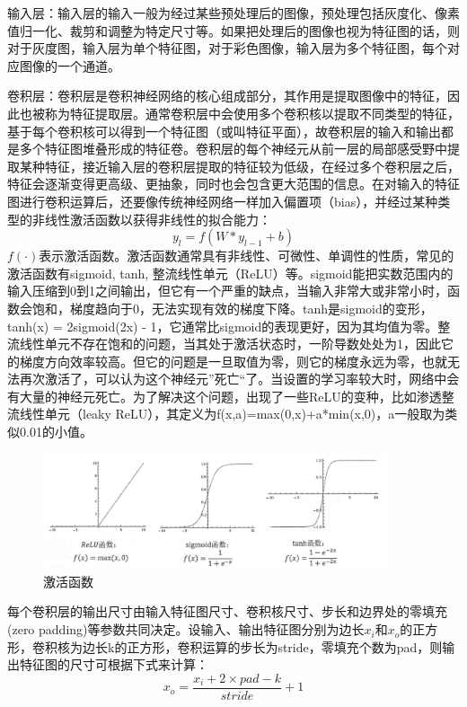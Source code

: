 输入层：输入层的输入一般为经过某些预处理后的图像，预处理包括灰度化、像素值归一化、裁剪和调整为特定尺寸等。如果把处理后的图像也视为特征图的话，则对于灰度图，输入层为单个特征图，对于彩色图像，输入层为多个特征图，每个对应图像的一个通道。

卷积层：卷积层是卷积神经网络的核心组成部分，其作用是提取图像中的特征，因此也被称为特征提取层。通常卷积层中会使用多个卷积核以提取不同类型的特征，基于每个卷积核可以得到一个特征图（或叫特征平面），故卷积层的输入和输出都是多个特征图堆叠形成的特征卷。卷积层的每个神经元从前一层的局部感受野中提取某种特征，接近输入层的卷积层提取的特征较为低级，在经过多个卷积层之后，特征会逐渐变得更高级、更抽象，同时也会包含更大范围的信息。在对输入的特征图进行卷积运算后，还要像传统神经网络一样加入偏置项（bias），并经过某种类型的非线性激活函数以获得非线性的拟合能力：
%
\begin{equation}
y_l = f(W*y_{l-1}+b)
\end{equation}
$f(\cdot)$表示激活函数。激活函数通常具有非线性、可微性、单调性的性质，常见的激活函数有sigmoid, tanh, 整流线性单元（ReLU）等。sigmoid能把实数范围内的输入压缩到0到1之间输出，但它有一个严重的缺点，当输入非常大或非常小时，函数会饱和，梯度趋向于0，无法实现有效的梯度下降。tanh是sigmoid的变形，tanh(x) = 2sigmoid(2x) - 1，它通常比sigmoid的表现更好，因为其均值为零。整流线性单元不存在饱和的问题，当其处于激活状态时，一阶导数处处为1，因此它的梯度方向效率较高。但它的问题是一旦取值为零，则它的梯度永远为零，也就无法再次激活了，可以认为这个神经元”死亡“了。当设置的学习率较大时，网络中会有大量的神经元死亡。为了解决这个问题，出现了一些ReLU的变种，比如渗透整流线性单元（leaky ReLU）\cite{maas2013rectifier}，其定义为f(x,a)=max(0,x)+a*min(x,0)，a一般取为类似0.01的小值。
\begin{figure}[htb] %
	\centering
	\includegraphics[width=4in]{figures/3_1_激活函数}
	\caption{激活函数} \label{fig:3_1_激活函数}
\end{figure}

每个卷积层的输出尺寸由输入特征图尺寸、卷积核尺寸、步长和边界处的零填充(zero padding)等参数共同决定。设输入、输出特征图分别为边长$x_{i}$和$x_{o}$的正方形，卷积核为边长k的正方形，卷积运算的步长为stride，零填充个数为pad，则输出特征图的尺寸可根据下式来计算：
%
\begin{equation}
x_o = \frac{x_i + 2 \times pad - k}{stride} + 1
\end{equation}


